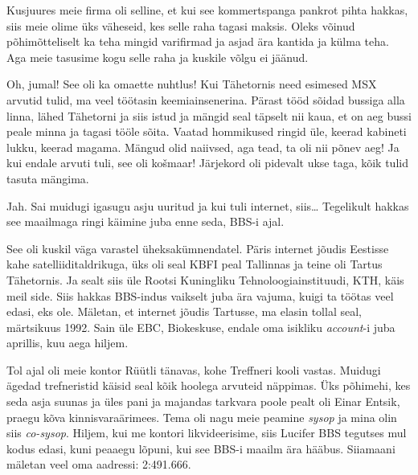 Kusjuures meie firma oli selline, et kui see kommertspanga  pankrot pihta 
hakkas, siis meie olime üks väheseid, kes selle raha tagasi maksis. Oleks 
võinud põhimõtteliselt ka teha mingid varifirmad ja asjad ära kantida ja külma 
teha. Aga meie tasusime kogu selle raha ja kuskile võlgu ei jäänud.


Oh, jumal! See oli ka omaette nuhtlus! Kui Tähetornis 
need esimesed MSX arvutid tulid, ma veel töötasin 
keemiainsenerina. Pärast tööd sõidad bussiga alla linna, lähed Tähetorni ja 
siis istud ja mängid seal täpselt nii kaua, et on aeg bussi peale minna ja 
tagasi tööle sõita. Vaatad hommikused ringid üle, keerad kabineti lukku, keerad 
magama. Mängud olid naiivsed, aga tead, ta  oli nii põnev aeg! Ja kui endale 
arvuti tuli, see oli košmaar! Järjekord oli pidevalt ukse taga, kõik tulid 
tasuta mängima. 

Jah. Sai muidugi igasugu asju uuritud ja kui tuli internet, siis\ldots 
Tegelikult hakkas see maailmaga ringi käimine juba enne seda, BBS-i ajal.
                 

See oli kuskil väga varastel üheksakümnendatel. Päris internet jõudis Eestisse 
kahe satelliiditaldrikuga, üks oli seal KBFI peal Tallinnas ja teine oli Tartus 
Tähetornis. Ja sealt siis üle Rootsi Kuningliku 
Tehnoloogiainstituudi, KTH,  käis meil 
side. Siis hakkas BBS-indus vaikselt juba ära vajuma, kuigi ta  töötas veel 
edasi, eks ole. Mäletan, et internet jõudis Tartusse,  ma elasin tollal  seal, 
märtsikuus 1992. Sain üle  EBC, Biokeskuse, endale oma 
isikliku \emph{account}-i juba aprillis, kuu aega hiljem.
                 
Tol ajal oli meie kontor Rüütli tänavas, kohe Treffneri kooli vastas. Muidugi ägedad trefneristid  käisid seal kõik 
hoolega arvuteid näppimas. Üks põhimehi, kes seda asja suunas ja üles pani ja 
majandas tarkvara poole pealt oli Einar Entsik, 
praegu kõva kinnisvaraärimees. Tema oli nagu meie peamine \emph{sysop} ja mina 
olin siis \emph{co-sysop}. Hiljem, kui me kontori likvideerisime, siis Lucifer 
BBS tegutses mul kodus edasi, kuni peaaegu lõpuni, kui see 
BBS-i maailm ära hääbus. Siiamaani mäletan veel oma aadressi: 2:491.666.
           

